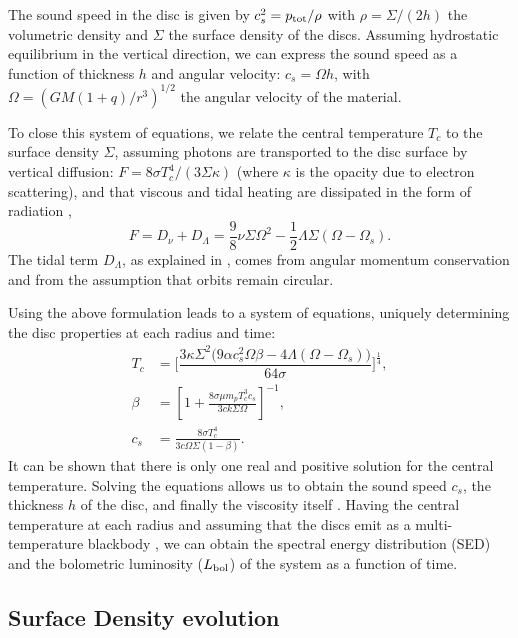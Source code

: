\documentclass[11pt,a4paper]{article}
\begin{document}
The sound speed in the disc is given by $c_s^2 = p_{\rm tot} / \rho$
with $\rho = \Sigma / (2 h)$ the volumetric density and $\Sigma$ the
surface density of the discs. Assuming hydrostatic equilibrium in the
vertical direction, we can express the sound speed as a function of
thickness $h$ and angular velocity: $c_s = \Omega h$, with $\Omega =
(GM(1+q)/r^3)^{1/2}$ the angular velocity of the material.

To close this system of equations, we relate the central temperature
$T_c$ to the surface density $\Sigma$, assuming photons are
transported to the disc surface by vertical diffusion: $F = 8 \sigma
T_c^4 / (3 \Sigma \kappa)$ (where $\kappa$ is the opacity due to
electron scattering), and that viscous and tidal heating are
dissipated in the form of radiation \citep{lodato09, kocsis12a},
%
\begin{equation}
F = D_\nu + D_\Lambda = \frac{9}{8} \nu \Sigma \Omega^2 - \frac{1}{2} \Lambda \Sigma (\Omega - \Omega_s). \label{eq:F}
\end{equation}
%
The tidal term $D_\Lambda$, as explained in \citet{lodato09}, comes
from angular momentum conservation and from the assumption that orbits
remain circular.

Using the above formulation leads to a system of equations, uniquely
determining the disc properties at each radius and time:
%
\begin{equation} 
\begin{aligned}
T_c &= \Bigg[\dfrac{3 \kappa \Sigma^2 \big(9 \alpha c_s^2 \Omega \beta - 4 \Lambda(\Omega - \Omega_s)\big)}{64 \sigma}\Bigg]^{\frac{1}{4}},\\
\beta &= \left[1 + \frac{8 \sigma \mu m_p T_c^3 c_s}{3 c k \Sigma \Omega}\right]^{- 1},\\
c_s &= \frac{8 \sigma T_c^4}{3 c \Omega \Sigma (1 - \beta)}.
\end{aligned}\label{eq:solution}
\end{equation}
%
It can be shown that there is only one real and positive solution for
the central temperature. Solving the equations allows us to obtain the
sound speed $c_s$, the thickness $h$ of the disc, and finally the
viscosity itself \citep{fontecilla17}. Having the central temperature
at each radius and assuming that the discs emit as a multi-temperature
blackbody \citep{frank02}, we can obtain the spectral energy
distribution (SED) and the bolometric luminosity ($L_{\rm bol}$) of
the system as a function of time.

\subsection{Surface Density evolution}
\end{document}
